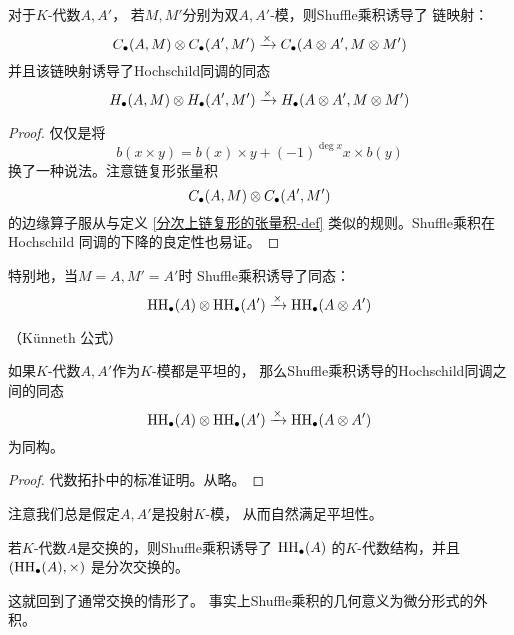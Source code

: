 \begin{cor}对于$K$-代数$A,A'$，
若$M,M'$分别为双$A,A'$-模，则Shuffle乘积诱导了
链映射：%
$$C_{\bullet}(A,M)\otimes C_{\bullet}(A',M')
\xrightarrow{\times} C_{\bullet}(A\otimes A',M\otimes M')$$
并且该链映射诱导了Hochschild同调的同态%
$$H_{\bullet}(A,M)\otimes H_{\bullet}(A',M')
\xrightarrow{\times}
H_{\bullet}(A\otimes A',M\otimes M')$$
\end{cor}

\begin{proof}
仅仅是将
$$b(x\times y)=
b(x)\times y+(-1)^{\deg x}
x\times b(y)$$
换了一种说法。注意链复形张量积
$$C_{\bullet}(A,M)\otimes C_{\bullet}(A',M')$$
的边缘算子服从与定义
\ref{分次上链复形的张量积-def}
类似的规则。Shuffle乘积在Hochschild
同调的下降的良定性也易证。
\end{proof}

特别地，当$M=A,M'=A'$时%
Shuffle乘积诱导了同态：
$$\operatorname{HH}_{\bullet}(A)\otimes \operatorname{HH}_{\bullet}(A')
\xrightarrow{\times} \operatorname{HH}_{\bullet}(A\otimes A')$$

\begin{thm}（K\"{u}nneth 公式）%

如果$K$-代数$A,A'$作为$K$-模都是平坦的，
那么Shuffle乘积诱导的Hochschild同调之间的同态
$$\operatorname{HH}_{\bullet}(A)\otimes\operatorname{HH}_{\bullet}(A')
\xrightarrow{\times}\operatorname{HH}_{\bullet}(A\otimes A')$$
为同构。
\end{thm}
\begin{proof}
代数拓扑中的标准证明。从略。
\end{proof}

注意我们总是假定$A,A'$是投射$K$-模，
从而自然满足平坦性。


\begin{prop}
若$K$-代数$A$是交换的，则Shuffle乘积诱导了
$\operatorname{HH}_{\bullet}(A)$ %
的$K$-代数结构，并且$(\operatorname{HH}_{\bullet}(A),\times)$
是分次交换的。
\end{prop}
这就回到了通常交换的情形了。
事实上Shuffle乘积的几何意义为微分形式的外积。

